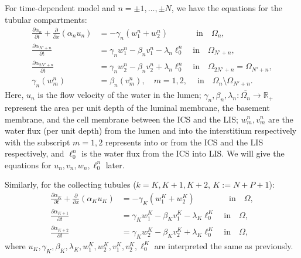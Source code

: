 \documentclass{article}
\begin{document}
For time-dependent model and $n=\pm 1,\dots,\pm N$, we have the equations for the tubular compartments:
\begin{align}
    \frac{\partial \alpha_n}{\partial t} + \frac{\partial}{\partial x}(\alpha_nu_n) &= -\gamma_n(w_{1}^n+w_{2}^n)\quad \quad \quad \ \ \text{in}\quad \Omega_{n},\\
    \frac{\partial \alpha_{N'+n}}{\partial t} &= \gamma_{n}w_{1}^n-\beta_nv_1^n-\lambda_n\ell_0^n\quad \text{in}\quad \Omega_{N'+n},\\
    \frac{\partial \alpha_{2N'+n}}{\partial t} &= \gamma_{n}w_{2}^n-\beta_nv_2^n+\lambda_n\ell_0^n\quad \text{in}\quad \Omega_{2N'+n}=\Omega_{N'+n},\\
    \gamma_n(w_m^n) &= \beta_n(v_m^n),\quad m=1,2,\quad \ \text{in}\quad \Omega_n\setminus\Omega_{N'+n}.
\end{align}
Here, $u_n$ is the flow velocity of the water in the lumen;
$\gamma_n,\beta_n,\lambda_n:\overline{\Omega_n}\to \mathbb{R}_+$ represent the area per unit depth of the luminal membrane, the basement membrane, and the cell membrane between the ICS and the LIS;
$w^n_m,v^n_m$ are the water flux (per unit depth) from the lumen and into the interstitium respectively with the subscript $m=1,2$ represents into or from the ICS and the LIS respectively, and $\ell_0^n$ is the water flux from the ICS into LIS.
We will give the equations for $u_n,v_n,w_n,\ell_0^n$ later.

Similarly, for the collecting tubules ($k=K,K+1,K+2$, $K:=N+P+1$):
\begin{align}
    \frac{\partial \alpha_K}{\partial t} + \frac{\partial}{\partial x}(\alpha_Ku_K) &= -\gamma_K(w_{1}^K+w_{2}^K)\qquad \qquad \, \text{in}\quad \Omega,\\
    \frac{\partial \alpha_{K+1}}{\partial t} &= \gamma_Kw_{1}^K-\beta_Kv_1^K-\lambda_K\ell_0^K\quad \text{in}\quad \Omega,\\
    \frac{\partial \alpha_{K+2}}{\partial t} &= \gamma_Kw_{2}^K-\beta_Kv_2^K+\lambda_K\ell_0^K\quad \text{in}\quad \Omega,
\end{align}
where $u_K,\gamma_K,\beta_K,\lambda_K,w_1^K,w_2^K,v_1^K,v_2^K,\ell^K_0$ are interpreted the same as previously.
\end{document}
